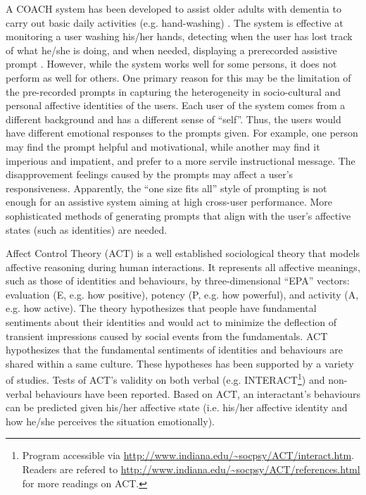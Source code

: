 A COACH system has been developed to assist older adults with dementia to carry out basic daily activities (e.g. hand-washing) \cite{boger2005decision, mihailidis2008coach}. The system is effective at monitoring a user washing his/her hands, detecting when the user has lost track of what he/she is doing, and when needed, displaying a prerecorded assistive prompt \cite{mihailidis2008coach}. However, while the system works well for some persons, it does not perform as well for others. One primary reason for this may be the limitation of the pre-recorded prompts in capturing the heterogeneity in socio-cultural and personal affective identities of the users. Each user of the system comes from a different background and has a different sense of ``self''. Thus, the users would have different emotional responses to the prompts given. For example, one person may find the prompt helpful and motivational, while another may find it imperious and impatient, and prefer to a more servile instructional message. The disapprovement feelings caused by the prompts may affect a user's responsiveness. Apparently, the ``one size fits all'' style of prompting is not enough for an assistive system aiming at high cross-user performance. More sophisticated methods of generating prompts that align with the user's affective states (such as identities) are needed.

Affect Control Theory (ACT) \cite{robinson2006affect} is a well established sociological theory that models affective reasoning during human interactions. It represents all affective meanings, such as those of identities and behaviours, by three-dimensional ``EPA'' vectors: evaluation (E, e.g. how positive), potency (P, e.g. how powerful), and activity (A, e.g. how active). The theory hypothesizes that people have fundamental sentiments about their identities and would act to minimize the deflection of transient impressions caused by social events from the fundamentals. ACT hypothesizes that the fundamental sentiments of identities and behaviours are shared within a same culture. These hypotheses has been supported by a variety of studies. Tests of ACT's validity on both verbal (e.g. INTERACT\footnote{Program accessible via \url{http://www.indiana.edu/~socpsy/ACT/interact.htm}. Readers are refered to \url{http://www.indiana.edu/~socpsy/ACT/references.html} for more readings on ACT.}) and non-verbal behaviours \cite{schroder2013culture} have been reported. Based on ACT, an interactant's behaviours can be predicted given his/her affective state (i.e. his/her affective identity and how he/she perceives the situation emotionally).

